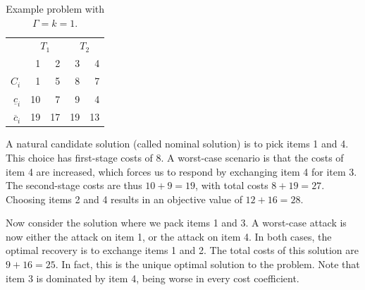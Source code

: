 \documentclass[a4paper,11pt,abstracton]{scrartcl}
\theoremstyle{definition}
\theoremstyle{remark}
\begin{document}
\begin{table}[htb]
\begin{center}
\begin{tabular}{r|rr|rr}
 & \multicolumn{2}{c|}{$T_1$} & \multicolumn{2}{c}{$T_2$} \\
 & 1 & 2 & 3 & 4 \\
 \hline
$C_i$ & 1 & 5 & 8 & 7 \\
$\underline{c}_i$ & 10 & 7 & 9 & 4 \\
$\overline{c}_i$ & 19 & 17 & 19 & 13
\end{tabular}
\end{center}
\caption{Example problem with $\Gamma=k=1$.\label{tab:example}}
\end{table}

A natural candidate solution (called nominal solution) is to pick items 1 and 4. This choice has first-stage costs of 8. A worst-case scenario is that the costs of item 4 are increased, which forces us to respond by exchanging item 4 for item 3. The second-stage costs are thus $10+9=19$, with total costs $8 + 19 = 27$. Choosing items 2 and 4 results in an objective value of $12+16=28$.

Now consider the solution where we pack items 1 and 3. A worst-case attack is now either the attack on item 1, or the attack on item 4. In both cases, the optimal recovery is to exchange items 1 and 2. The total costs of this solution are $9+16 = 25$. In fact, this is the unique optimal solution to the problem.
Note that item 3 is dominated by item 4, being worse in every cost coefficient. 
\end{document}
